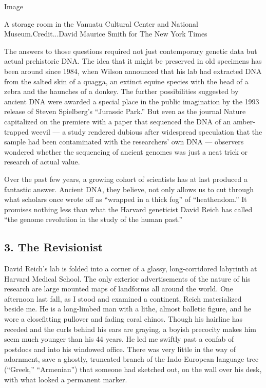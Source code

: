 Image

A storage room in the Vanuatu Cultural Center and National
Museum.Credit...David Maurice Smith for The New York Times

The answers to those questions required not just contemporary genetic
data but actual prehistoric DNA. The idea that it might be preserved in
old specimens has been around since 1984, when Wilson announced that his
lab had extracted DNA from the salted skin of a quagga, an extinct
equine species with the head of a zebra and the haunches of a donkey.
The further possibilities suggested by ancient DNA were awarded a
special place in the public imagination by the 1993 release of Steven
Spielberg's ``Jurassic Park.'' But even as the journal Nature
capitalized on the premiere with a paper that sequenced the DNA of an
amber-trapped weevil --- a study rendered dubious after widespread
speculation that the sample had been contaminated with the researchers'
own DNA --- observers wondered whether the sequencing of ancient genomes
was just a neat trick or research of actual value.

Over the past few years, a growing cohort of scientists has at last
produced a fantastic answer. Ancient DNA, they believe, not only allows
us to cut through what scholars once wrote off as ``wrapped in a thick
fog'' of ``heathendom.'' It promises nothing less than what the Harvard
geneticist David Reich has called ``the genome revolution in the study
of the human past.''

\hypertarget{3-the-revisionist}{%
\subsection{\texorpdfstring{\textbf{3. The
Revisionist}}{3. The Revisionist}}\label{3-the-revisionist}}

David Reich's lab is folded into a corner of a glassy, long-corridored
labyrinth at Harvard Medical School. The only exterior advertisements of
the nature of his research are large mounted maps of landforms all
around the world. One afternoon last fall, as I stood and examined a
continent, Reich materialized beside me. He is a long-limbed man with a
lithe, almost balletic figure, and he wore a closefitting pullover and
fading coral chinos. Though his hairline has receded and the curls
behind his ears are graying, a boyish precocity makes him seem much
younger than his 44 years. He led me swiftly past a confab of postdocs
and into his windowed office. There was very little in the way of
adornment, save a ghostly, truncated branch of the Indo-European
language tree (``Greek,'' ``Armenian'') that someone had sketched out,
on the wall over his desk, with what looked a permanent marker.

